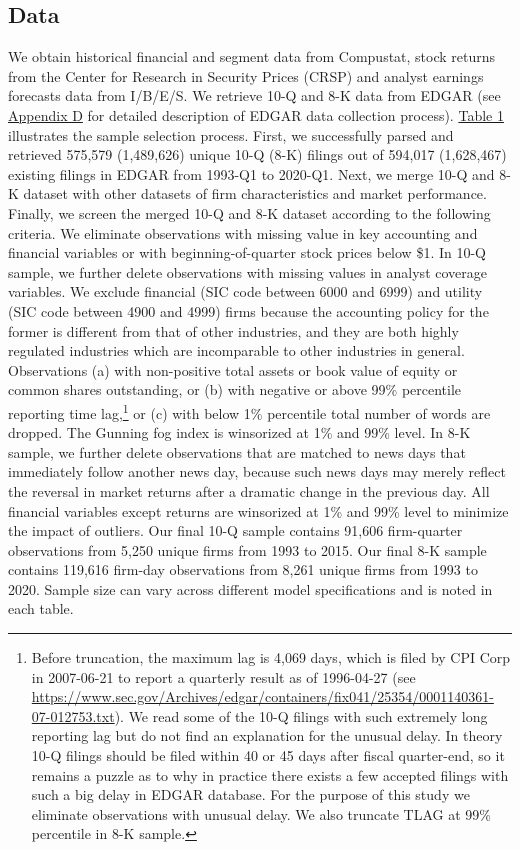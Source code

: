\documentclass[letterpaper,12pt]{article}
\begin{document}
\begin{spacing}{1.5}
\subsection{Data}
\noindent We obtain historical financial and segment data from Compustat, stock returns from the Center for Research in Security Prices (CRSP) and analyst earnings forecasts data from I/B/E/S. We retrieve 10-Q and 8-K data from EDGAR (see \hyperref[appd]{Appendix D} for detailed description of EDGAR data collection process). \hyperref[T1]{Table 1} illustrates the sample selection process. First, we successfully parsed and retrieved 575,579 (1,489,626) unique 10-Q (8-K) filings out of 594,017 (1,628,467) existing filings in EDGAR from 1993-Q1 to 2020-Q1. Next, we merge 10-Q and 8-K dataset with other datasets of firm characteristics and market performance. Finally, we screen the merged 10-Q and 8-K dataset according to the following criteria. We eliminate observations with missing value in key accounting and financial variables or with beginning-of-quarter stock prices below \$1. In 10-Q sample, we further delete observations with missing values in analyst coverage variables. We exclude financial (SIC code between 6000 and 6999) and utility (SIC code between 4900 and 4999) firms because the accounting policy for the former is different from that of other industries, and they are both highly regulated industries which are incomparable to other industries in general. Observations (a) with non-positive total assets or book value of equity or common shares outstanding, or (b) with negative or above 99\% percentile reporting time lag,\footnote{Before truncation, the maximum lag is 4,069 days, which is filed by CPI Corp in 2007-06-21 to report a quarterly result as of 1996-04-27 (see \url{https://www.sec.gov/Archives/edgar/containers/fix041/25354/0001140361-07-012753.txt}). We read some of the 10-Q filings with such extremely long reporting lag but do not find an explanation for the unusual delay. In theory 10-Q filings should be filed within 40 or 45 days after fiscal quarter-end, so it remains a puzzle as to why in practice there exists a few accepted filings with such a big delay in EDGAR database. For the purpose of this study we eliminate observations with unusual delay. We also truncate TLAG at 99\% percentile in 8-K sample.} or (c) with below 1\% percentile total number of words are dropped. The Gunning fog index is winsorized at 1\% and 99\% level. In 8-K sample, we further delete observations that are matched to news days that immediately follow another news day, because such news days may merely reflect the reversal in market returns after a dramatic change in the previous day. All financial variables except returns are winsorized at 1\% and 99\% level to minimize the impact of outliers. Our final 10-Q sample contains 91,606 firm-quarter observations from 5,250 unique firms from 1993 to 2015. Our final 8-K sample contains 119,616 firm-day observations from 8,261 unique firms from 1993 to 2020. Sample size can vary across different model specifications and is noted in each table. 


\end{spacing}
\end{document}
